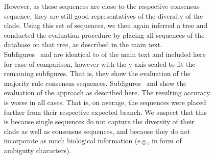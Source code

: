 \begin{figure}[hpbt]
{        However, as these sequences are close to the respective consensus sequence,
        they are still good representatives of the diversity of the clade.
        Using this set of sequences, we then again inferred a tree and
        conducted the evaluation procedure by placing all sequences of the database on that tree,
        as described in the main text.
        \\
        Subfigures~
        and  are identical to
         of the main text and included here for ease of comparison,
        however with the y-axis scaled to fit the remaining subfigures.
        That is, they show the evaluation of the majority rule consensus sequences.
        Subfigures~ and 
        show the evaluation of the approach as described here.
        The resulting accuracy is worse in all cases.
        That is, on average, the sequences were placed further from their respective expected branch.
        We suspect that this is because single sequences do not capture the diversity of their clade
        as well as consensus sequences, and because they do not incorporate as much biological information
        (e.g., in form of ambiguity characters).
    }
    \label{fig:single_seqs}
\end{figure}



